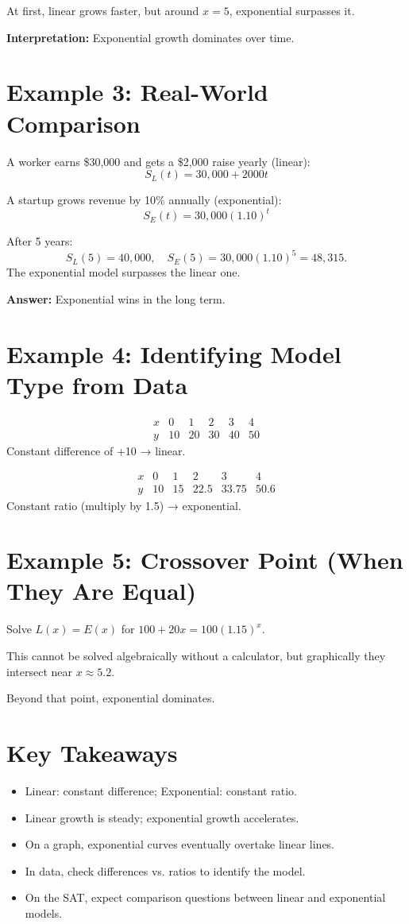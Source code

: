 \documentclass[14pt]{extarticle}
\begin{document}
At first, linear grows faster, but around \(x = 5\), exponential surpasses it.

\textbf{Interpretation:} Exponential growth dominates over time.

\section*{Example 3: Real-World Comparison}

A worker earns \$30,000 and gets a \$2,000 raise yearly (linear):
\[
S_L(t) = 30{,}000 + 2000t
\]

A startup grows revenue by 10\% annually (exponential):
\[
S_E(t) = 30{,}000(1.10)^t
\]

After 5 years:
\[
S_L(5) = 40{,}000, \quad S_E(5) = 30{,}000(1.10)^5 = 48{,}315.
\]
The exponential model surpasses the linear one.

\textbf{Answer:} Exponential wins in the long term.

\section*{Example 4: Identifying Model Type from Data}

\[
\begin{array}{c|ccccc}
x & 0 & 1 & 2 & 3 & 4 \\ \hline
y & 10 & 20 & 30 & 40 & 50
\end{array}
\]
Constant difference of +10 → linear.

\[
\begin{array}{c|ccccc}
x & 0 & 1 & 2 & 3 & 4 \\ \hline
y & 10 & 15 & 22.5 & 33.75 & 50.6
\end{array}
\]
Constant ratio (multiply by 1.5) → exponential.

\section*{Example 5: Crossover Point (When They Are Equal)}

Solve \(L(x) = E(x)\) for \(100 + 20x = 100(1.15)^x.\)

This cannot be solved algebraically without a calculator, but graphically they intersect near \(x \approx 5.2.\)

Beyond that point, exponential dominates.

\section*{Key Takeaways}
\begin{itemize}
  \item Linear: constant difference; Exponential: constant ratio.
  \item Linear growth is steady; exponential growth accelerates.
  \item On a graph, exponential curves eventually overtake linear lines.
  \item In data, check differences vs. ratios to identify the model.
  \item On the SAT, expect comparison questions between linear and exponential models.
\end{itemize}
\end{document}
